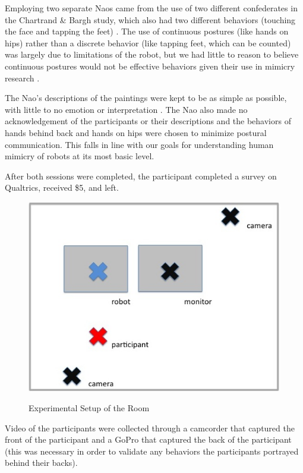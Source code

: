 \documentclass{acm_proc_article-sp}
\begin{document}
Employing two separate Naos came from the use of two different confederates in the Chartrand \& Bargh study, which also had two different behaviors (touching the face and tapping the feet) \cite{chartrand1999chameleon}. The use of continuous postures (like hands on hips) rather than a discrete behavior (like tapping feet, which can be counted) was largely due to limitations of the robot, but we had little to reason to believe continuous postures would not be effective behaviors given their use in mimicry research \cite{chartrand2013antecedents}. 

The Nao's descriptions of the paintings were kept to be as simple as possible, with little to no emotion or interpretation \cite{hofree2014bridging}. The Nao also made no acknowledgement of the participants or their descriptions and the behaviors of hands behind back and hands on hips were chosen to minimize postural communication. This falls in line with our goals for understanding human mimicry of robots at its most basic level.

After both sessions were completed, the participant completed a survey on Qualtrics, received \$5, and left.

\begin{figure}[t!]
\centering
 \includegraphics[width=1.05\linewidth]{images/setup.jpg}\\
 \caption{Experimental Setup of the Room}
 \label{setup} %
\end{figure}

Video of the participants were collected through a camcorder that captured the front of the participant and a GoPro that captured the back of the participant (this was necessary in order to validate any behaviors the participants portrayed behind their backs).
\end{document}
